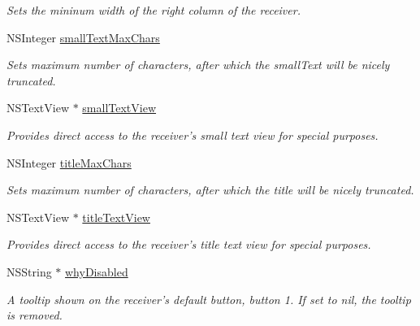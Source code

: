 \begin{CompactItemize}
\begin{CompactList}\small\item\em Sets the mininum width of the right column of the receiver. \item\end{CompactList}\item 
NSInteger \hyperlink{interface_s_s_y_alert_bcde739174ec356844c26b7487ea1a79}{smallTextMaxChars}
\begin{CompactList}\small\item\em Sets maximum number of characters, after which the smallText will be nicely truncated. \item\end{CompactList}\item 
NSTextView $\ast$ \hyperlink{interface_s_s_y_alert_b15db601566d115c516c43320f306603}{smallTextView}
\begin{CompactList}\small\item\em Provides direct access to the receiver's small text view for special purposes. \item\end{CompactList}\item 
NSInteger \hyperlink{interface_s_s_y_alert_99e51047e4caf119c09dc51042afa504}{titleMaxChars}
\begin{CompactList}\small\item\em Sets maximum number of characters, after which the title will be nicely truncated. \item\end{CompactList}\item 
NSTextView $\ast$ \hyperlink{interface_s_s_y_alert_787999e7c2336835bccfccb6a956128e}{titleTextView}
\begin{CompactList}\small\item\em Provides direct access to the receiver's title text view for special purposes. \item\end{CompactList}\item 
\hypertarget{interface_s_s_y_alert_d0b61bef0522e8b093f737dbd2362e35}{
NSString $\ast$ \hyperlink{interface_s_s_y_alert_d0b61bef0522e8b093f737dbd2362e35}{whyDisabled}}
\label{interface_s_s_y_alert_d0b61bef0522e8b093f737dbd2362e35}

\begin{CompactList}\small\item\em A tooltip shown on the receiver's default button, button 1. If set to nil, the tooltip is removed. \item\end{CompactList}\end{CompactItemize}


